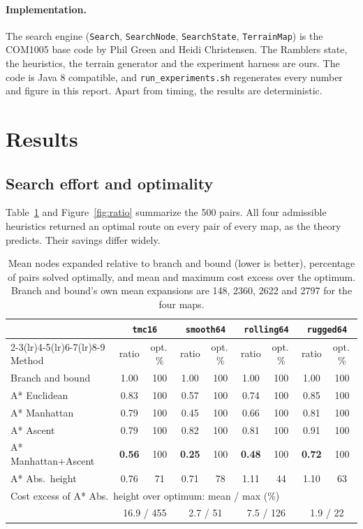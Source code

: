 \documentclass[11pt]{article}
\begin{document}
\paragraph{Implementation.}
The search engine (\texttt{Search}, \texttt{SearchNode}, \texttt{SearchState}, \texttt{TerrainMap}) is the COM1005 base code by Phil Green and Heidi Christensen. The Ramblers state, the heuristics, the terrain generator and the experiment harness are ours. The code is Java 8 compatible, and \texttt{run\_experiments.sh} regenerates every number and figure in this report. Apart from timing, the results are deterministic.

\section{Results}

\subsection{Search effort and optimality}
Table~\ref{tab:main} and Figure~\ref{fig:ratio} summarize the 500 pairs. All four admissible heuristics returned an optimal route on every pair of every map, as the theory predicts. Their savings differ widely.

\begin{table}[t]
\centering
\caption{Mean nodes expanded relative to branch and bound (lower is better), percentage of pairs solved optimally, and mean and maximum cost excess over the optimum. Branch and bound's own mean expansions are 148, 2360, 2622 and 2797 for the four maps.}
\label{tab:main}
\small
\begin{tabular}{l cc cc cc cc}
\toprule
& \multicolumn{2}{c}{\texttt{tmc16}} & \multicolumn{2}{c}{\texttt{smooth64}} & \multicolumn{2}{c}{\texttt{rolling64}} & \multicolumn{2}{c}{\texttt{rugged64}} \\
\cmidrule(lr){2-3}\cmidrule(lr){4-5}\cmidrule(lr){6-7}\cmidrule(lr){8-9}
Method & ratio & opt.\,\% & ratio & opt.\,\% & ratio & opt.\,\% & ratio & opt.\,\% \\
\midrule
Branch and bound & 1.00 & 100 & 1.00 & 100 & 1.00 & 100 & 1.00 & 100 \\
A* Euclidean     & 0.83 & 100 & 0.57 & 100 & 0.74 & 100 & 0.85 & 100 \\
A* Manhattan     & 0.79 & 100 & 0.45 & 100 & 0.66 & 100 & 0.81 & 100 \\
A* Ascent        & 0.79 & 100 & 0.82 & 100 & 0.81 & 100 & 0.91 & 100 \\
A* Manhattan+Ascent & \textbf{0.56} & 100 & \textbf{0.25} & 100 & \textbf{0.48} & 100 & \textbf{0.72} & 100 \\
A* Abs.\ height  & 0.76 & 71 & 0.71 & 78 & 1.11 & 44 & 1.10 & 63 \\
\midrule
\multicolumn{9}{l}{Cost excess of A* Abs.\ height over optimum: mean / max (\%)} \\
& \multicolumn{2}{c}{16.9 / 455} & \multicolumn{2}{c}{2.7 / 51} & \multicolumn{2}{c}{7.5 / 126} & \multicolumn{2}{c}{1.9 / 22} \\
\bottomrule
\end{tabular}
\end{table}
\end{document}
